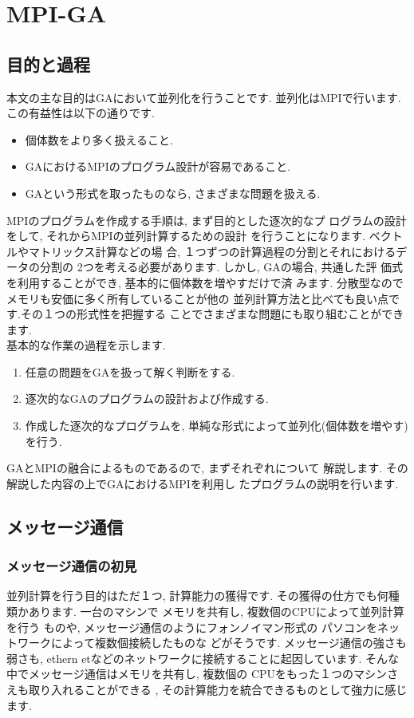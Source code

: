 \documentclass[a4paper,titlepage]{jreport}
\begin{document}
\part{MPI-GA}

\chapter{目的と過程}
本文の主な目的はGAにおいて並列化を行うことです.
並列化はMPIで行います.この有益性は以下の通りです.

\begin{itemize}
\item 個体数をより多く扱えること.
\item GAにおけるMPIのプログラム設計が容易であること.
\item GAという形式を取ったものなら, さまざまな問題を扱える. 
\end{itemize}

MPIのプログラムを作成する手順は, まず目的とした逐次的なプ
ログラムの設計をして, それからMPIの並列計算するための設計
を行うことになります. ベクトルやマトリックス計算などの場
合, １つずつの計算過程の分割とそれにおけるデータの分割の
2つを考える必要があります. しかし, GAの場合, 共通した評
価式を利用することができ, 基本的に個体数を増やすだけで済
みます. 分散型なのでメモリも安価に多く所有していることが他の
並列計算方法と比べても良い点です.その１つの形式性を把握する
ことでさまざまな問題にも取り組むことができます.\\

基本的な作業の過程を示します.
\begin{enumerate}
\item 任意の問題をGAを扱って解く判断をする.
\item 逐次的なGAのプログラムの設計および作成する.
\item 作成した逐次的なプログラムを, 単純な形式によって並列化(個体数を増やす)を行う.
\end{enumerate}


GAとMPIの融合によるものであるので, まずそれぞれについて
解説します. その解説した内容の上でGAにおけるMPIを利用し
たプログラムの説明を行います.

\chapter{メッセージ通信}

\section{メッセージ通信の初見}
並列計算を行う目的はただ１つ, 計算能力の獲得です.
その獲得の仕方でも何種類かあります. 一台のマシンで
メモリを共有し, 複数個のCPUによって並列計算を行う
ものや, メッセージ通信のようにフォンノイマン形式の
パソコンをネットワークによって複数個接続したものな
どがそうです. メッセージ通信の強さも弱さも, ethern
etなどのネットワークに接続することに起因しています.
そんな中でメッセージ通信はメモリを共有し, 複数個の
CPUをもった１つのマシンさえも取り入れることができる
, その計算能力を統合できるものとして強力に感じます.
\end{document}
